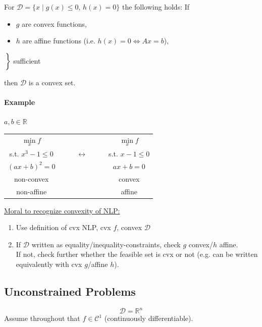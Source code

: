\documentclass[12pt,a4paper,oneside]{scrartcl}
\begin{document}
	For $\mathcal{D} = \{ x \mid g(x) \leq 0, \, h(x) = 0 \}$ the following holds: If
	
	\begin{minipage}{0.65\textwidth}
		\begin{itemize}
			\item $g$ are convex functions,
			\item $h$ are affine functions (i.e. $h(x) = 0 \Leftrightarrow Ax=b$),
		\end{itemize}
	\end{minipage}
	\begin{minipage}{0.15\textwidth}
		$\left.\vphantom{\begin{array}{l}g\\h\end{array}}\right\}$ sufficient
	\end{minipage}
	
	
	then $\mathcal{D}$ is a convex set.
	
	\paragraph{Example} $a,b\in\mathbb{R}$
	
	\begin{table}[H]
		\centering
		\begin{tabular}{c c c}
			$\underset{x}{\min}f$ & & $\underset{x}{\min}f$\\
			s.t. $x^3-1\leq0$ & $\qquad\leftrightarrow\qquad$ & s.t. $x-1\leq0$\\
			$(ax+b)^2=0$ & & $ax+b=0$\\
			non-convex & & convex\\
			non-affine & & affine
		\end{tabular}
	\end{table}
	
	\underline{Moral to recognize convexity of NLP:}
	\begin{enumerate}
		\item Use definition of cvx NLP, cvx $f$, convex $\mathcal{D}$
		\item If $\mathcal{D}$ written as equality/inequality-constraints, check $g$ convex/$h$ affine.\\
		If not, check further whether the feasible set is cvx or not (e.g. can be written equivalently with cvx $g$/affine $h$).
	\end{enumerate}
	
	\subsection{Unconstrained Problems}
	\[
		\mathcal{D} = \mathbb{R}^n
	\]
	Assume throughout that $f \in \mathcal{C}^1$ (continuously differentiable).
	
\end{document}
